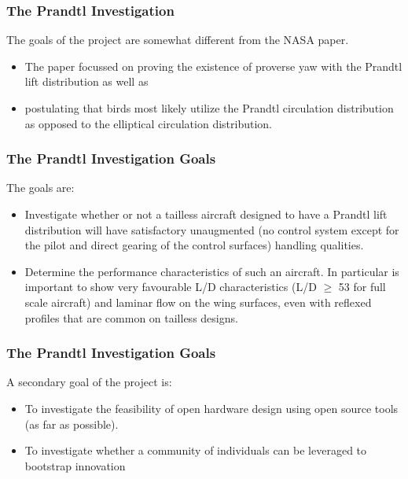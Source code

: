 \documentclass{beamer}
\begin{document}
\begin{frame}
\frametitle{The Prandtl Investigation}

The goals of the project are somewhat different from the NASA paper.  

\begin{itemize}
\item The paper focussed on proving the existence of proverse yaw with the Prandtl lift distribution as well as 
\item postulating that birds most likely utilize the Prandtl circulation distribution as opposed to the elliptical circulation distribution.  
\end{itemize}

\end{frame}



\begin{frame}
\frametitle{The Prandtl Investigation Goals}

The goals are:

\begin{itemize}
\item Investigate whether or not a tailless aircraft designed to have a Prandtl lift distribution will have satisfactory unaugmented (no control system except for the pilot and direct gearing of the control surfaces) handling qualities.
\item Determine the performance characteristics of such an aircraft.  In particular is important to show very favourable L/D characteristics (L/D $\geq$ 53 for full scale aircraft) and laminar flow on the wing surfaces, even with reflexed profiles that are common on tailless designs.
\end{itemize}

\end{frame}


\begin{frame}
\frametitle{The Prandtl Investigation Goals}

A secondary goal of the project is:

\begin{itemize}
\item To investigate the feasibility of open hardware design using open source tools (as far as possible).  
\item To investigate whether a community of individuals can be leveraged to bootstrap innovation
\end{itemize}

\end{frame}
\end{document}
